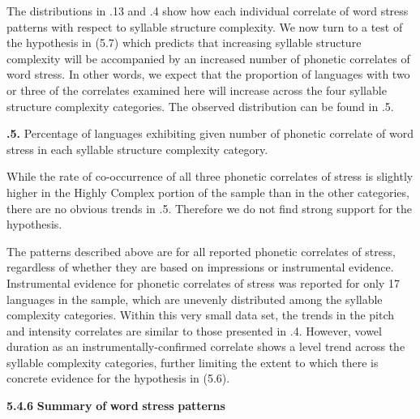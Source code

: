   The distributions in .13 and .4 show how each individual correlate of word stress patterns with respect to syllable structure complexity. We now turn to a test of the hypothesis in (5.7) which predicts that increasing syllable structure complexity will be accompanied by an increased number of phonetic correlates of word stress. In other words, we expect that the proportion of languages with two or three of the correlates examined here will increase across the four syllable structure complexity categories. The observed distribution can be found in .5.





\textbf{.5.} Percentage of languages exhibiting given number of phonetic correlate of word stress in each syllable structure complexity category.



  While the rate of co-occurrence of all three phonetic correlates of stress is slightly higher in the Highly Complex portion of the sample than in the other categories, there are no obvious trends in .5. Therefore we do not find strong support for the hypothesis.



  The patterns described above are for all reported phonetic correlates of stress, regardless of whether they are based on impressions or instrumental evidence. Instrumental evidence for phonetic correlates of stress was reported for only 17 languages in the sample, which are unevenly distributed among the syllable complexity categories. Within this very small data set, the trends in the pitch and intensity correlates are similar to those presented in .4. However, vowel duration as an instrumentally-confirmed correlate shows a level trend across the syllable complexity categories, further limiting the extent to which there is concrete evidence for the hypothesis in (5.6).



\textbf{5.4.6} \textbf{Summary} \textbf{of} \textbf{word} \textbf{stress} \textbf{patterns}



